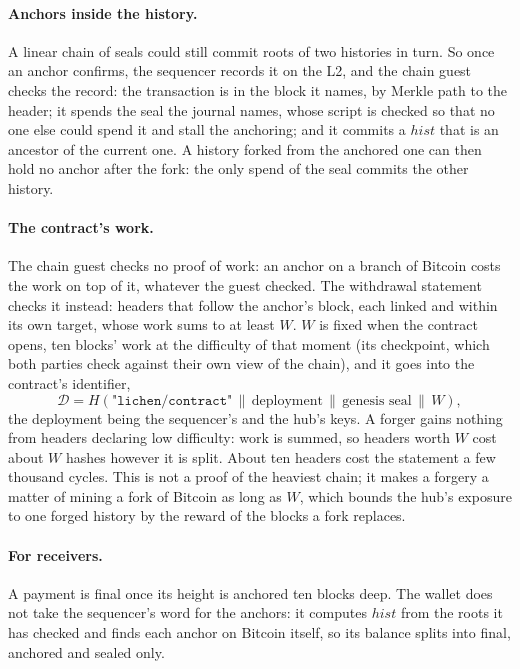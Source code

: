 \documentclass[11pt]{article}
\begin{document}
\paragraph{Anchors inside the history.} A linear chain of seals could
still commit roots of two histories in turn. So once an anchor confirms,
the sequencer records it on the L2, and the chain guest checks the
record: the transaction is in the block it names, by Merkle path to the
header; it spends the seal the journal names, whose script is checked so
that no one else could spend it and stall the anchoring; and it commits
a $\mathit{hist}$ that is an ancestor of the current one. A history
forked from the anchored one can then hold no anchor after the fork: the
only spend of the seal commits the other history.

\paragraph{The contract's work.} The chain guest checks no proof of
work: an anchor on a branch of Bitcoin costs the work on top of it,
whatever the guest checked. The withdrawal statement checks it instead:
headers that follow the anchor's block, each linked and within its own
target, whose work sums to at least $W$. $W$ is fixed when the contract
opens, ten blocks' work at the difficulty of that moment (its
checkpoint, which both parties check against their own view of the
chain), and it goes into the contract's identifier,
\[
  \mathcal{D} = H(\texttt{"lichen/contract"} \,\|\, \text{deployment} \,\|\, \text{genesis seal} \,\|\, W),
\]
the deployment being the sequencer's and the hub's keys. A forger gains
nothing from headers declaring low difficulty: work is summed, so
headers worth $W$ cost about $W$ hashes however it is split. About ten
headers cost the statement a few thousand cycles. This is not a proof of
the heaviest chain; it makes a forgery a matter of mining a fork of
Bitcoin as long as $W$, which bounds the hub's exposure to one forged
history by the reward of the blocks a fork replaces.

\paragraph{For receivers.} A payment is final once its height is
anchored ten blocks deep. The wallet does not take the sequencer's word
for the anchors: it computes $\mathit{hist}$ from the roots it has
checked and finds each anchor on Bitcoin itself, so its balance splits
into final, anchored and sealed only.
\end{document}
